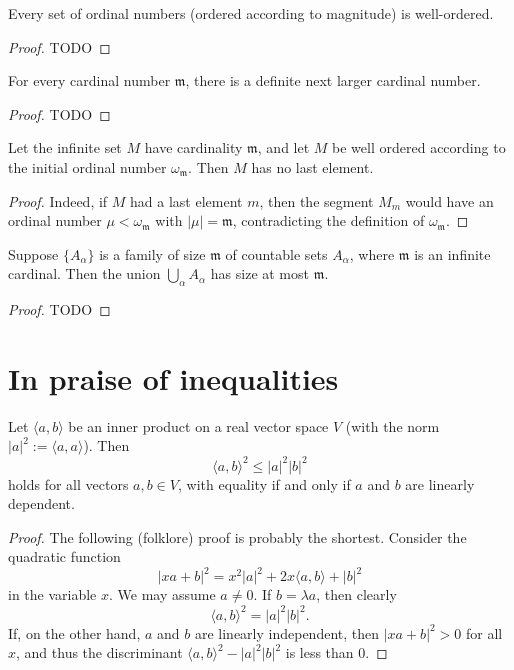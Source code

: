 \begin{proposition}
  \label{ch19proposition3}
  Every set of ordinal numbers (ordered according to magnitude) is well-ordered.
\end{proposition}
\begin{proof}
  TODO
\end{proof}

\begin{proposition}
  \label{ch19proposition4}
  For every cardinal number \(\mathfrak{m}\), there is a definite next larger cardinal number.
\end{proposition}
\begin{proof}
  TODO
\end{proof}

\begin{proposition}
  \label{ch19proposition5}
  Let the infinite set \(M\) have cardinality \(\mathfrak{m}\), and let \(M\) be well ordered
  according to the initial ordinal number \(\omega_{\mathfrak{m}}\). Then \(M\) has no last element.
\end{proposition}
\begin{proof}
  Indeed, if \(M\) had a last element \(m\), then the segment \(M_m\) would have an
  ordinal number \(\mu < \omega_{\mathfrak{m}}\) with \(|\mu| = \mathfrak{m}\),
  contradicting the definition of \(\omega_{\mathfrak{m}}\).
\end{proof}

\begin{proposition}
  \label{ch19proposition6}
  Suppose \(\{A_\alpha\}\) is a family of size \(\mathfrak{m}\) of countable sets \(A_\alpha\),
  where \(\mathfrak{m}\) is an infinite cardinal. Then the union \(\bigcup_\alpha A_\alpha\)
  has size at most \(\mathfrak{m}\).
\end{proposition}
\begin{proof}
  TODO
\end{proof}


\chapter{In praise of inequalities}
\label{chapter20}
\begin{theorem}
  \label{ch20theoremI}
  \leanok
Let $\langle a, b \rangle$ be an inner product on a real vector space $V$ (with the norm $|a|^2 := \langle a, a \rangle$). Then
\[
\langle a, b \rangle^2 \leq |a|^2 |b|^2
\]
holds for all vectors $a, b \in V$, with equality if and only if $a$ and $b$ are linearly dependent.
\end{theorem}
\begin{proof}
  \leanok
The following (folklore) proof is probably the shortest. Consider the quadratic function
\[
|x a + b|^2 = x^2 |a|^2 + 2x \langle a, b \rangle + |b|^2
\]
in the variable $x$. We may assume $a \neq 0$. If $b = \lambda a$, then clearly
\[
\langle a, b \rangle^2 = |a|^2 |b|^2.
\]
If, on the other hand, $a$ and $b$ are linearly independent, then $|x a + b|^2 > 0$ for all $x$,
and thus the discriminant $\langle a, b \rangle^2 - |a|^2 |b|^2$ is less than 0.
\end{proof}

